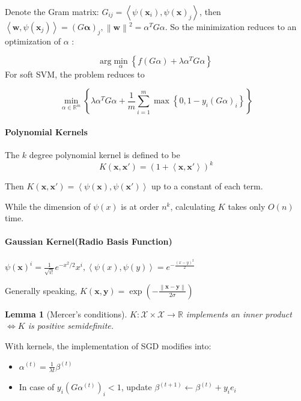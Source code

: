 \documentclass{book}
\newtheorem{Lemma}[Thm]{Lemma}
\begin{document}
 Denote the Gram matrix: $G_{ij}= \left\langle \psi(\mathbf{x}_i), \psi(\mathbf{x})_{j} \right\rangle$, then $\left\langle \mathbf{w}, \psi(\mathbf{x}_{j}) \right\rangle= (G\mathbf{\alpha})_j, \left\|\mathbf{w}\right\|^2= \alpha^T G \alpha$. So the minimization reduces to an optimization of $\alpha$ : 

 \begin{equation*}
\mathrm{arg}\min_{\alpha}\left\{ f(G\alpha)+\lambda\alpha^T G\alpha \right\}
 \end{equation*}
 For soft SVM, the problem reduces to

 \begin{equation*}
   \min_{\alpha\in \mathbb{R}^m}\left\{ \lambda\alpha^T G\alpha +\frac{1}{m}\sum\limits_{i=1}^m \max \left\{ 0,1-y_i(G\alpha)_i \right\} \right\}
\end{equation*}

\paragraph{Polynomial Kernels}
The $k$ degree polynomial kernel is defined to be
\begin{equation*}
K(\mathbf{x}, \mathbf{x}')=(1+\left\langle \mathbf{x}, \mathbf{x}' \right\rangle)^k
\end{equation*}

Then $K(\mathbf{x}, \mathbf{x}')=\left\langle \psi(\mathbf{x}), \psi(\mathbf{x}') \right\rangle$ up to a constant of each term.

While the dimension of $\psi(x)$ is at order $n^k$, calculating $K$ takes only $O(n)$ time.

\paragraph{Gaussian Kernel(Radio Basis Function)}
$\psi(\mathbf{x})^i= \frac{1}{\sqrt{i!}}e^{-x^2/2} x^i, \left\langle \psi(x), \psi(y) \right\rangle= e^{-\frac{(x-y)^2}{2}}$

Generally speaking, $K(\mathbf{x}, \mathbf{y})=\exp(-\frac{\left\|\mathbf{x}-\mathbf{y}\right\|}{2\sigma})$

\begin{Lemma}[Mercer's conditions]
  $K: \mathcal{X}\times \mathcal{X}\to \mathbb{R}$ implements an inner product $\Leftrightarrow K$ is positive semidefinite.
\end{Lemma}

With kernels, the implementation of SGD modifies into:
\begin{itemize}
\item $\alpha^{(t)}=\frac{1}{\lambda t}\beta^{(t)}$
\item In case of $y_i(G\alpha^{(t)})_i<1$, update $\beta^{(t+1)}\leftarrow \beta^{(t)}+y_i e_{i}$
\end{itemize}
\end{document}
